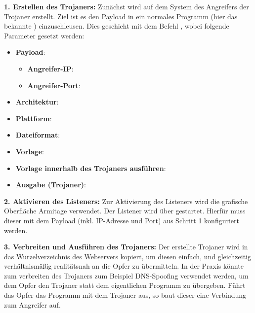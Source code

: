 \textbf{1. Erstellen des Trojaners: }
Zunächst wird auf dem System des Angreifers der Trojaner erstellt.
Ziel ist es den Payload  in ein normales Programm (hier das bekannte ) einzuschleusen. 
Dies geschieht mit dem Befehl  \cite{OSMSFV}, wobei folgende Parameter gesetzt werden:
\begin{itemize}
	\item \textbf{Payload}: \\
	      \begin{itemize}
		      \item  \textbf{Angreifer-IP}: 
		      \item \textbf{Angreifer-Port}: 
		  \end{itemize}
	\item \textbf{Architektur}: 
	\item \textbf{Plattform}: 
	\item \textbf{Dateiformat}: 
	\item \textbf{Vorlage}: 
	\item \textbf{Vorlage innerhalb des Trojaners ausführen}: 
	\item \textbf{Ausgabe (Trojaner)}: 
\end{itemize}

\bigskip
\textbf{2. Aktivieren des Listeners: } 
Zur Aktivierung des Listeners wird die grafische Oberfläche Armitage verwendet.
Der Listener wird über  gestartet.
Hierfür muss dieser mit dem Payload (inkl. IP-Adresse und Port) aus Schritt 1 konfiguriert werden.

\bigskip
\textbf{3. Verbreiten und Ausführen des Trojaners: }
Der erstellte Trojaner wird in das Wurzelverzeichnis des Webservers  kopiert, um diesen einfach, und gleichzeitig verhältnismäßig realitätsnah an die Opfer zu übermitteln.
In der Praxis könnte zum verbreiten des Trojaners zum Beispiel DNS-Spoofing verwendet werden, um dem Opfer den Trojaner statt dem eigentlichen Programm zu übergeben.
Führt das Opfer das Programm mit dem Trojaner aus, so baut dieser eine Verbindung zum Angreifer auf. 

